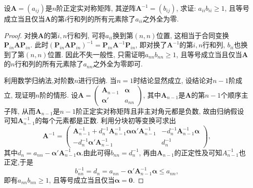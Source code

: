 \documentclass[../../main.tex]{subfiles}
\begin{document}
\begin{example}
设$\boldsymbol{A}=(a_{ij})$是$n$阶正定实对称矩阵, 其逆阵$\boldsymbol{A}^{-1}=(b_{ij})$, 求证: $a_{ii}b_{ii}\geq 1$, 且等号成立当且仅当$\boldsymbol{A}$的第$i$行和列的所有元素除了$a_{ii}$之外全为零.
\end{example}
\begin{proof}
对换$\boldsymbol{A}$的第$i,n$行和列, 可将$a_{ii}$换到第$(n,n)$位置, 这相当于合同变换$\boldsymbol{P}_{in}\boldsymbol{A}\boldsymbol{P}_{in}$. 此时$(\boldsymbol{P}_{in}\boldsymbol{A}\boldsymbol{P}_{in})^{-1}=\boldsymbol{P}_{in}\boldsymbol{A}^{-1}\boldsymbol{P}_{in}$, 即对换了$\boldsymbol{A}^{-1}$的第$i,n$行和列, $b_{ii}$也换到了第$(n,n)$位置. 因此不失一般性, 只需证明$a_{nn}b_{nn}\geq 1$, 且等号成立当且仅当$\boldsymbol{A}$的$n$行和列的所有元素除了$a_{nn}$之外全为零即可. 

利用数学归纳法,对阶数$n$进行归纳. 当$n = 1$时结论显然成立, 设结论对$n - 1$阶成立, 现证明$n$阶的情形. 设$\boldsymbol{A}=\begin{pmatrix}
\boldsymbol{A}_{n - 1} & \boldsymbol{\alpha} \\
\boldsymbol{\alpha}' & a_{nn}
\end{pmatrix}$, 其中$\boldsymbol{A}_{n - 1}$是$\boldsymbol{A}$的第$n - 1$个顺序主子阵, 从而$\boldsymbol{A}_{n - 1}$是$n - 1$阶正定实对称矩阵且非主对角元都是负数, 故由归纳假设可知$\boldsymbol{A}_{n - 1}^{-1}$的每个元素都是正数. 利用分块初等变换可求出
\[
\boldsymbol{A}^{-1}=\begin{pmatrix}
\boldsymbol{A}_{n - 1}^{-1}+d_n^{-1}\boldsymbol{A}_{n - 1}^{-1}\boldsymbol{\alpha}\boldsymbol{\alpha}'\boldsymbol{A}_{n - 1}^{-1} & -d_n^{-1}\boldsymbol{A}_{n - 1}^{-1}\boldsymbol{\alpha} \\
-d_n^{-1}\boldsymbol{\alpha}'\boldsymbol{A}_{n - 1}^{-1} & d_n^{-1}
\end{pmatrix},
\]
其中$d_n = a_{nn}-\boldsymbol{\alpha}'\boldsymbol{A}_{n - 1}^{-1}\boldsymbol{\alpha}$.由此可得$b_{nn}=d_n^{-1}$, 再由$\boldsymbol{A}_{n - 1}$的正定性及可知$A_{n-1}^{-1}$也正定,于是
\[
b_{nn}^{-1}=d_n=a_{nn}-\boldsymbol{\alpha}'\boldsymbol{A}_{n - 1}^{-1}\boldsymbol{\alpha}\leq a_{nn},
\]
即有$a_{nn}b_{nn}\geq 1$, 且等号成立当且仅当$\boldsymbol{\alpha}=\boldsymbol{0}$. 
\end{proof}
\end{document}

